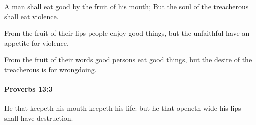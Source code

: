 			\begin{versebox}
					\item[BHS] 
					\item[ASV] A man shall eat good by the fruit of his mouth; But the soul of the treacherous shall eat violence.
					\item[NIV] From the fruit of their lips people enjoy good things, but the unfaithful have an appetite for violence.
					\item[NRSV] From the fruit of their words good persons eat good things, but the desire of the treacherous is for wrongdoing.
			\end{versebox}

		\paragraph{Proverbs 13:3} %
			\label{PROVERBS-13-3}

			He that keepeth his mouth keepeth his life: but he that openeth wide his lips shall have destruction.

